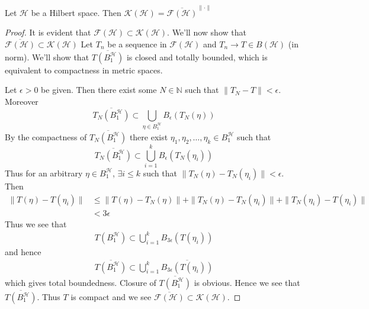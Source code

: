 \begin{theorem}
  Let $\mathcal{H}$ be a Hilbert space. Then $\mathcal{K}(\mathcal{H}) =
  \overline{\mathcal{F}(\mathcal{H})}^{\|\cdot\|}$
\end{theorem}
\begin{proof}
  It is evident that $\mathcal{F}(\mathcal{H}) \subset
  \mathcal{K}(\mathcal{H})$. We'll
  now show that
  $\overline{\mathcal{F}(\mathcal{H})}\subset \mathcal{K}(\mathcal{H}) $
  Let $T_n$ be a sequence in $\mathcal{F}(\mathcal{H})$ and $T_n \to
  T \in B(\mathcal{H})$ (in
  norm). We'll show that $\overline{T(B_1^\mathcal{H})}$ is closed and
  totally bounded, which is equivalent to compactness in metric
  spaces.

  Let $\epsilon > 0$ be given. Then there exist some $N \in
  \mathbb{N}$ such that $\|T_N - T\| < \epsilon$. Moreover \[
    \overline{T_N(B_1^\mathcal{H})} \subset \bigcup_{\eta \in  B_1^\mathcal{H}}
    B_\epsilon(T_N(\eta))
  \]
  By the compactness of $\overline{T_N(B_1^\mathcal{H})}$ there exist
  $\eta_1 , \eta_2 , \ldots , \eta_k \in B_1^\mathcal{H}$ such that  \[
    \overline{T_N(B_1^\mathcal{H})} \subset \bigcup_{i =
    1}^{k}B_\epsilon(T_N(\eta_i))
  \]
  Thus for an arbitrary $\eta \in B_1^\mathcal{H}$, $\exists i \le  k$
  such that $\|T_N(\eta) - T_N(\eta_i)\| < \epsilon$. Then
  \begin{align*}
    \|T(\eta) - T(\eta_i)\| &\le \|T(\eta) - T_N(\eta)\| + \|T_N(\eta)
    - T_N(\eta_i)\| + \|T_N(\eta_i) - T(\eta_i)\| \\
    & < 3 \epsilon
  \end{align*}
  Thus we see that
  \begin{align*}
    T(B_1^\mathcal{H}) \subset \bigcup_{i = 1}^{k} B_{3\epsilon}(T(\eta_i))
  \end{align*}
  and hence
  \begin{align*}
    \overline{T(B_1^\mathcal{H})} \subset \bigcup_{i = 1}^{k}
    \overline{B_{3\epsilon}(T(\eta_i))}
  \end{align*}
  which gives total boundedness. Closure of $\overline{
  T(B_1^\mathcal{H})}$ is obvious. Hence we see that
  $\overline{T(B_1^\mathcal{H})}$. Thus $T$ is compact and we see
  $\overline{\mathcal{F}(\mathcal{H})} \subset \mathcal{K}(\mathcal{H})$.


\end{proof}
